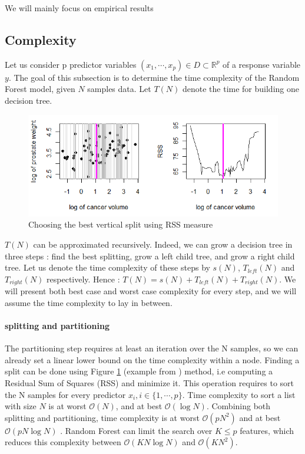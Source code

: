 \documentclass[english,11pt,openany]{article}
\theoremstyle{definition}
\newcommand{\R}{\mathbb{R}}
\newcommand{\bigO}{\mathcal{O}}
\theoremstyle{plain}
\theoremstyle{definition}
\begin{document}
\begin{appendices}
		We will mainly focus on empirical results 
		
		
		\subsection{Complexity}
		
		Let us consider p predictor variables $(x_1, \cdots, x_p) \in D \subset \R^p$  of a response variable $y$. The goal of this subsection is to determine the time complexity of the Random Forest model, given $N$ samples data. 
		\newline
		Let $T(N)$ denote the time for building one decision tree. 
		
		\begin{figure}[h!]
			\includegraphics[scale=0.8]{time_complexity/sorting_split.png}
			\caption{Choosing the best vertical split using RSS measure} \label{figure:sorting}
		\end{figure}
		
		
		$T(N)$ can be approximated recursively. 
		Indeed, we can grow a decision tree in three steps : find the best splitting, grow a left child tree, and grow a right child tree.
		\newline 
		Let us denote the time complexity of these steps by $s(N)$, $T_{left}(N)$ and $T_{right}(N)$ respectively. 
		Hence : $T(N) = s(N) + T_{left}(N) + T_{right}(N)$.
		We will present both best case and worst case complexity for every step, and we will assume the time complexity to lay in between. 
		\paragraph{splitting and partitioning}
		The partitioning step requires at least an iteration over the N samples, so we can already set a linear lower bound on the time complexity within a node.
		Finding a split can be done using Figure \ref{figure:sorting} (example from \cite{Cutler:slides}) method, i.e computing a Residual Sum of Squares (RSS) and minimize it. 
		This operation requires to sort the N samples for every predictor $x_i, i\in \{1, \cdots, p\}$. 
		Time complexity to sort a list with size $N$ is at worst $\mathcal{O} (N)$, and at best $\bigO(\log N)$. 
		Combining both splitting and partitioning, time complexity is at worst $\mathcal{O} (p N^2)$ and at best $\bigO(p N \log N)$ . 
		Random Forest can limit the search over $K \leq p$ features, which reduces this complexity between $\mathcal{O} (K N\log N)$ and $\mathcal{O} (K N^2)$. 
		

\end{appendices}
\end{document}
